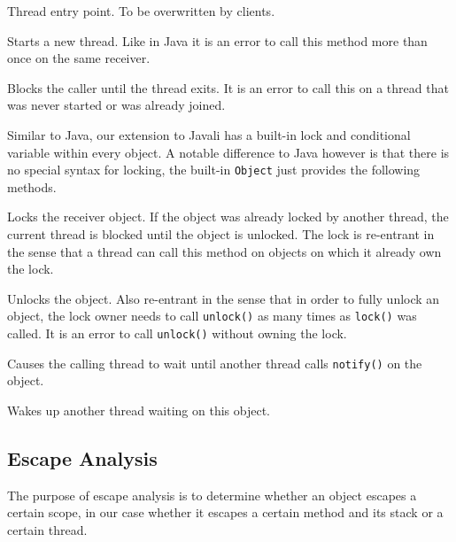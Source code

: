 \documentclass[letterpaper]{article}
\begin{document}
\begin{description}[leftmargin=!,labelwidth=\widthof{\texttt{start()}}]
 \item[\texttt{run()}] Thread entry point. To be overwritten by clients.
 \item[\texttt{start()}] Starts a new thread. Like in Java it is an error to
 call this method more than once on the same receiver.
 \item[\texttt{join()}] Blocks the caller until the thread exits. It is an error
 to call this on a thread that was never started or was already joined.
\end{description}

Similar to Java, our extension to Javali has a built-in lock and conditional variable
within every object. A notable difference to Java however is that there is
no special syntax for locking, the built-in \texttt{Object} just provides the
following methods.

\begin{description}[leftmargin=!,labelwidth=\widthof{\texttt{unlock()}}]
 \item[\texttt{lock()}] Locks the receiver object. If the object was already locked by
 another thread, the current thread is blocked until the object is unlocked. The
 lock is re-entrant in the sense that a thread can call this method on objects
 on which it already own the lock.
 \item[\texttt{unlock()}] Unlocks the object. Also re-entrant in the sense that
 in order to fully unlock an object,
 the lock owner needs to call \texttt{unlock()} as many times as \texttt{lock()}
 was called. It is an error to call \texttt{unlock()} without owning the lock.
 \item[\texttt{wait()}] Causes the calling thread to wait until another thread
 calls \texttt{notify()} on the object.
 \item[\texttt{notify()}] Wakes up another thread waiting on this object.
\end{description} %

\subsection{Escape Analysis}

The purpose of escape analysis is to determine whether an object escapes a certain
scope, in our case whether it escapes a certain method and its stack or a certain thread.
\end{document}
